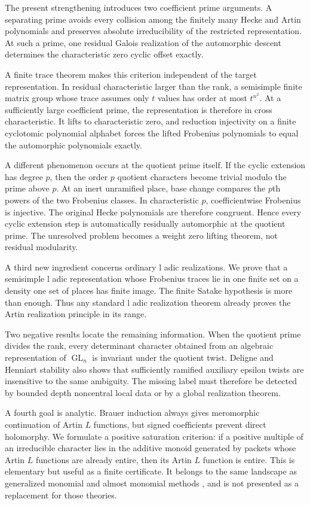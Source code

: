 \documentclass{aomart}
\theoremstyle{definition}
\theoremstyle{remark}
\newcommand{\GL}{\operatorname{GL}}
\begin{document}
The present strengthening introduces two coefficient prime arguments. A separating prime avoids every collision among the finitely many Hecke and Artin polynomials and preserves absolute irreducibility of the restricted representation. At such a prime, one residual Galois realization of the automorphic descent determines the characteristic zero cyclic offset exactly.

A finite trace theorem makes this criterion independent of the target representation. In residual characteristic larger than the rank, a semisimple finite matrix group whose trace assumes only \(t\) values has order at most \(t^{n^2}\). At a sufficiently large coefficient prime, the representation is therefore in cross characteristic. It lifts to characteristic zero, and reduction injectivity on a finite cyclotomic polynomial alphabet forces the lifted Frobenius polynomials to equal the automorphic polynomials exactly.

A different phenomenon occurs at the quotient prime itself. If the cyclic extension has degree \(p\), then the order \(p\) quotient characters become trivial modulo the prime above \(p\). At an inert unramified place, base change compares the \(p\)th powers of the two Frobenius classes. In characteristic \(p\), coefficientwise Frobenius is injective. The original Hecke polynomials are therefore congruent. Hence every cyclic extension step is automatically residually automorphic at the quotient prime. The unresolved problem becomes a weight zero lifting theorem, not residual modularity.

A third new ingredient concerns ordinary l adic realizations. We prove that a semisimple l adic representation whose Frobenius traces lie in one finite set on a density one set of places has finite image. The finite Satake hypothesis is more than enough. Thus any standard l adic realization theorem already proves the Artin realization principle in its range.

Two negative results locate the remaining information. When the quotient prime divides the rank, every determinant character obtained from an algebraic representation of \(\GL_n\) is invariant under the quotient twist. Deligne and Henniart stability also shows that sufficiently ramified auxiliary epsilon twists are insensitive to the same ambiguity. The missing label must therefore be detected by bounded depth noncentral local data or by a global realization theorem.

A fourth goal is analytic. Brauer induction always gives meromorphic continuation of Artin \(L\) functions, but signed coefficients prevent direct holomorphy. We formulate a positive saturation criterion: if a positive multiple of an irreducible character lies in the additive monoid generated by packets whose Artin \(L\) functions are already entire, then its Artin \(L\) function is entire. This is elementary but useful as a finite certificate. It belongs to the same landscape as generalized monomial and almost monomial methods \cite{Konig2010,CimpoeasNicolae2020}, and is not presented as a replacement for those theories.
\end{document}

